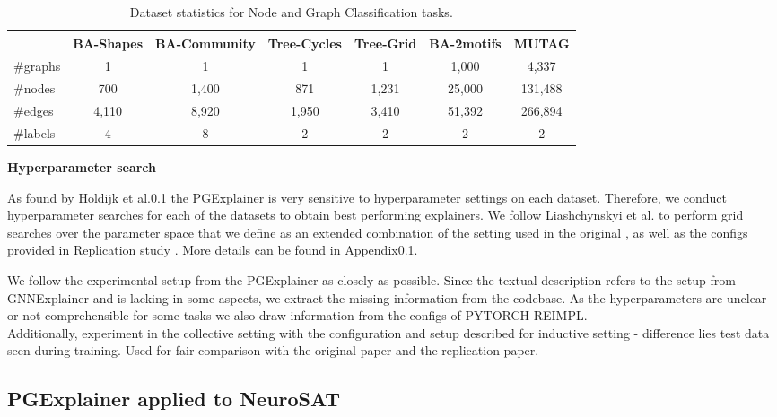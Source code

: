 \begin{table}[h]
    \centering
    \scriptsize
    \begin{tabular}{l|cccc|cc}
    \hline
    \textbf{} & \textbf{BA-Shapes} & \textbf{BA-Community} & \textbf{Tree-Cycles} & \textbf{Tree-Grid} & \textbf{BA-2motifs} & \textbf{MUTAG} \\
    \hline
    \#graphs & 1 & 1 & 1 & 1 & 1,000 & 4,337 \\
    \#nodes  & 700 & 1,400 & 871 & 1,231 & 25,000 & 131,488 \\
    \#edges  & 4,110 & 8,920 & 1,950 & 3,410 & 51,392 & 266,894 \\
    \#labels & 4 & 8 & 2 & 2 & 2 & 2 \\
    \hline
    \end{tabular}
    \caption{Dataset statistics for Node and Graph Classification tasks.}
    \label{tab:dataset-statistics}
    \end{table}

\bigskip

\textbf{Hyperparameter search}

As found by Holdijk et al.\ref{} the PGExplainer is very sensitive to hyperparameter settings on each dataset. Therefore, we conduct hyperparameter searches for each of the datasets to obtain best performing explainers. We follow Liashchynskyi et al. \cite{liashchynskyi2019grid} to perform grid searches over the parameter space that we define as an extended combination of the setting used in the original \cite{}, as well as the configs provided in Replication study \cite{}. More details can be found in Appendix\ref{}.




We follow the experimental setup from the PGExplainer as closely as possible. Since the textual description refers to the setup from GNNExplainer and is lacking in some aspects, we extract the missing information from the codebase. As the hyperparameters are unclear or not comprehensible for some tasks we also draw information from the configs of PYTORCH REIMPL. \\



Additionally, experiment in the collective setting with the configuration and setup described for inductive setting - difference lies test data seen during training. Used for fair comparison with the original paper and the replication paper.



\subsection{PGExplainer applied to NeuroSAT}

